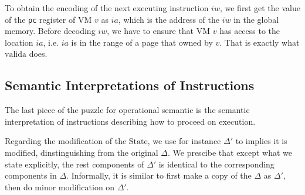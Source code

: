 \documentclass[a4paper]{article}
\newcommand*{\STATE}{\text{State}}
\newcommand*{\valida}{\text{valida}}
\begin{document}
To obtain the encoding of the next executing instruction $iw$, we first get the
value of the \texttt{pc} register of VM $v$ as $ia$, which is the address of the
$iw$ in the global memory. Before decoding $iw$, we have to ensure that VM $v$
has access to the location $ia$, i.e. $ia$ is in the range of a page that owned
by $v$. That is exactly what $\valida$ does. 


\subsection{Semantic Interpretations of Instructions}

The last piece of the puzzle for operational semantic is the semantic interpretation
of instructions describing how to proceed on execution.

Regarding the modification of the $\STATE$, we use for instance $\Delta'$ to
implies it is modified, dinstinguishing from the original $\Delta$.
We prescibe that except what we state explicitly, the rest components of $\Delta'$ is identical to the corresponding components in $\Delta$. Informally, it is similar to first make a copy of the $\Delta$ as $\Delta'$, then do minor modification on $\Delta'$.
\end{document}
